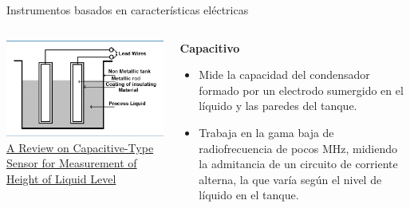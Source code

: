\documentclass[aspectratio=169]{beamer}
\begin{document}
\begin{frame}{Instrumentos basados en características eléctricas}
    \begin{columns}[c, onlytextwidth]
        \begin{column}{0.5\textwidth}
                \centering
            \includegraphics[width = 0.9\linewidth]{fig/Nivel/capacitance.png}\\           \tiny{\href{https://www.semanticscholar.org/paper/A-Review-on-Capacitive-Type-Sensor-for-Measurement-Kumar-Rajita/2e3d6ede8338e72be9972741eafed7f50388b53a}{A Review on Capacitive-Type Sensor for Measurement of Height of Liquid Level}}
        \end{column}
        \begin{column}{0.50\textwidth}
        
        \textbf{Capacitivo}
            \begin{itemize}
                \item Mide la capacidad del condensador formado por un electrodo sumergido en el líquido y las paredes del tanque.
                \item Trabaja en la gama baja de radiofrecuencia de pocos MHz, midiendo la admitancia de un circuito de corriente alterna, la que varía según el nivel de líquido en el tanque.
            \end{itemize}
        
        \end{column}
    \end{columns}
\end{frame}
\end{document}
